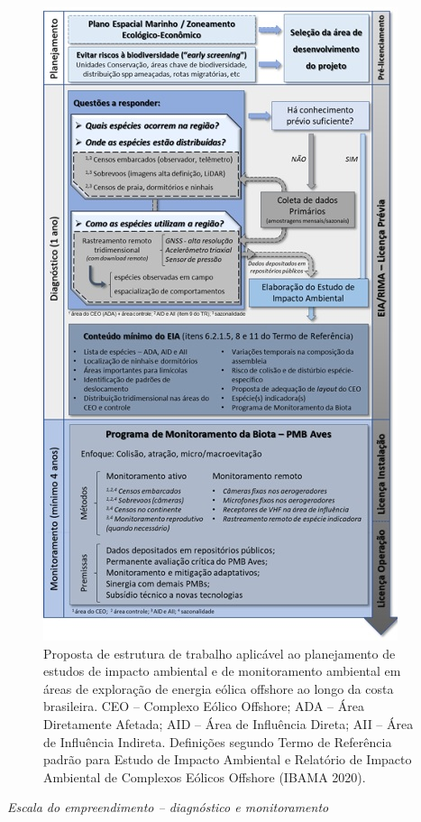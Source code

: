 \documentclass[
  oneside]{scrbook}
\begin{document}
\begin{figure}[H]

{\centering \includegraphics[width=0.65\linewidth]{imagens/cap08/Figura_8.6} 

}

\caption{Proposta de estrutura de trabalho aplicável ao planejamento de estudos de impacto ambiental e de monitoramento ambiental em áreas de exploração de energia eólica offshore ao longo da costa brasileira. CEO – Complexo Eólico Offshore; ADA – Área Diretamente Afetada; AID – Área de Influência Direta; AII – Área de Influência Indireta. Definições segundo Termo de Referência padrão para Estudo de Impacto Ambiental e Relatório de Impacto Ambiental de Complexos Eólicos Offshore (IBAMA 2020).}\label{fig:66}
\end{figure}

\emph{Escala do empreendimento -- diagnóstico e monitoramento}
\end{document}

